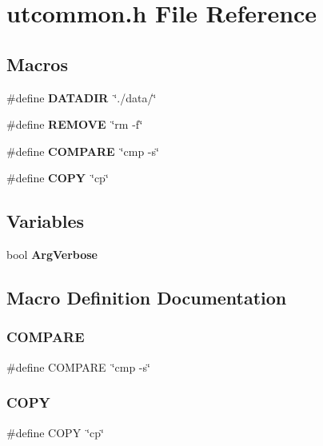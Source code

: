 \section{utcommon.\+h File Reference}
\label{utcommon_8h}
\subsection*{Macros}
\begin{DoxyCompactItemize}
\item 
\#define \textbf{ D\+A\+T\+A\+D\+IR}~\char`\"{}./data/\char`\"{}
\item 
\#define \textbf{ R\+E\+M\+O\+VE}~\char`\"{}rm -\/f\char`\"{}
\item 
\#define \textbf{ C\+O\+M\+P\+A\+RE}~\char`\"{}cmp -\/s\char`\"{}
\item 
\#define \textbf{ C\+O\+PY}~\char`\"{}cp\char`\"{}
\end{DoxyCompactItemize}
\subsection*{Variables}
\begin{DoxyCompactItemize}
\item 
bool \textbf{ Arg\+Verbose}
\end{DoxyCompactItemize}


\subsection{Macro Definition Documentation}
\mbox{\label{utcommon_8h_a34d12e2e386464a40aff3b4d9cf7019e}} 
\subsubsection{C\+O\+M\+P\+A\+RE}
{\footnotesize\ttfamily \#define C\+O\+M\+P\+A\+RE~\char`\"{}cmp -\/s\char`\"{}}

\mbox{\label{utcommon_8h_a9e77d621548de2a80bc9c5909bfa2b8a}} 
\subsubsection{C\+O\+PY}
{\footnotesize\ttfamily \#define C\+O\+PY~\char`\"{}cp\char`\"{}}

